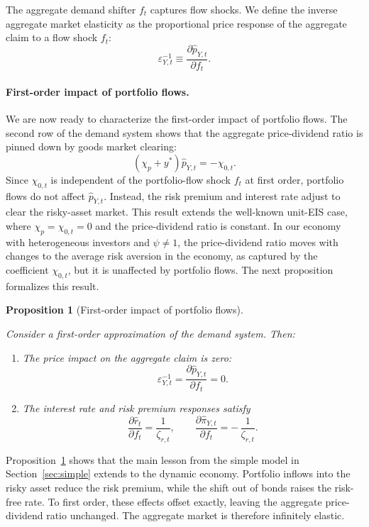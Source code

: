 \documentclass[12pt,english]{article}
\newtheorem{prop}{Proposition}
\begin{document}
The aggregate demand shifter $f_t$ captures flow shocks.
We define the inverse aggregate market elasticity as the proportional price response of the aggregate claim to a flow shock $f_t$:
\[
    \varepsilon_{Y,t}^{-1}
    \equiv
    \frac{\partial \hat p_{Y,t}}{\partial f_t}.
\]

\paragraph{First-order impact of portfolio flows.}
We are now ready to characterize the first-order impact of portfolio flows.
The second row of the demand system shows that the aggregate price-dividend ratio is pinned down by goods market clearing:
\[
    \left(\chi_p+y^*\right)\hat p_{Y,t}=-\chi_{0,t}.
\]
Since $\chi_{0,t}$ is independent of the portfolio-flow shock $f_t$ at first order, portfolio flows do not affect $\hat p_{Y,t}$.
Instead, the risk premium and interest rate adjust to clear the risky-asset market.
This result extends the well-known unit-EIS case, where $\chi_p=\chi_{0,t}=0$ and the price-dividend ratio is constant.
In our economy with heterogeneous investors and $\psi\neq 1$, the price-dividend ratio moves with changes to the average risk aversion in the economy, as captured by the coefficient $\chi_{0,t}$, but it is unaffected by portfolio flows.
The next proposition formalizes this result.


\begin{prop}[First-order impact of portfolio flows]\label{prop:first_order}
    
    Consider a first-order approximation of the demand system.
Then:
\begin{enumerate}[label=(\roman*)]
    \item The price impact on the aggregate claim is zero:
    \[
        \varepsilon_{Y,t}^{-1}
        =
        \frac{\partial \hat p_{Y,t}}{\partial f_t}
        =
        0.
    \]
    \item The interest rate and risk premium responses satisfy
    \[
        \frac{\partial \hat r_t}{\partial f_t}
        =
        \frac{1}{\zeta_{r,t}},
        \qquad
        \frac{\partial \hat \pi_{Y,t}}{\partial f_t}
        =
        -\,\frac{1}{\zeta_{r,t}}.
    \]
\end{enumerate}
\end{prop}

Proposition~\ref{prop:first_order} shows that the main lesson from the simple model in Section~\ref{sec:simple} extends to the dynamic economy.
Portfolio inflows into the risky asset reduce the risk premium, while the shift out of bonds raises the risk-free rate.
To first order, these effects offset exactly, leaving the aggregate price-dividend ratio unchanged.
The aggregate market is therefore infinitely elastic.
\end{document}
